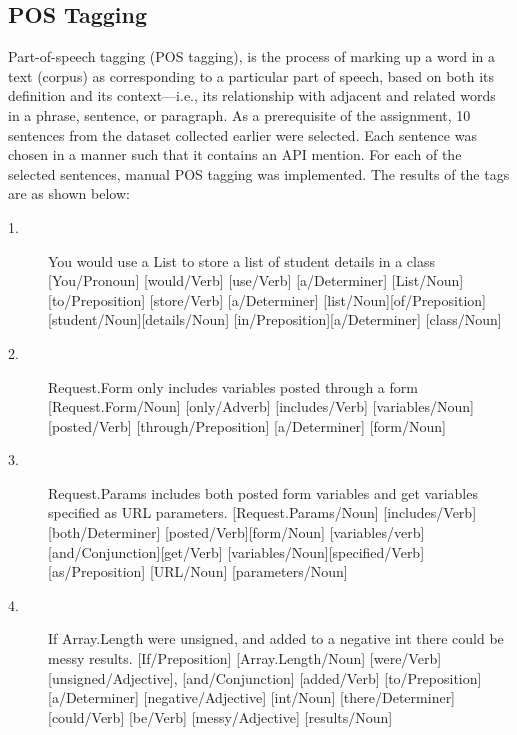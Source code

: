 \documentclass{sig-alternate-05-2015}
\begin{document}
\subsection{POS Tagging}

Part-of-speech tagging (POS tagging), is the process of marking up a word in a text (corpus) as corresponding to a particular part of speech, based on both its definition and its context—i.e., its relationship with adjacent and related words in a phrase, sentence, or paragraph. As a prerequisite of the assignment, 10 sentences from the dataset collected earlier were selected. Each sentence was chosen in a manner such that it contains an API mention. For each of the selected sentences, manual POS tagging was implemented. The results of the tags are as shown below: 

\begin{description}
\item[1.]
You would use a List to store a list of student details in a class \linebreak
{[You/Pronoun]} [would/Verb] [use/Verb] [a/Determiner] \linebreak
{[List/Noun]}{[to/Preposition]} [store/Verb] [a/Determiner] \linebreak
{[list/Noun]}{[of/Preposition]}[student/Noun][details/Noun] \linebreak
{[in/Preposition]}{[a/Determiner]} [class/Noun]

\item[2.]
Request.Form only includes variables posted through a form \linebreak
{[Request.Form/Noun]} [only/Adverb] [includes/Verb] \linebreak
{[variables/Noun]}[posted/Verb] [through/Preposition] \linebreak
{[a/Determiner]} [form/Noun]

\item[3.]
Request.Params includes both posted form variables and get variables specified as URL parameters. \linebreak
{[Request.Params/Noun]} [includes/Verb] \linebreak
{[both/Determiner]} {[posted/Verb]}[form/Noun] \linebreak
{[variables/verb]} [and/Conjunction]{[get/Verb]} \linebreak
{[variables/Noun]}[specified/Verb] [as/Preposition]\linebreak
{[URL/Noun]} [parameters/Noun]

\item[4.]
If Array.Length were unsigned, and added to a negative int there could be messy results. \linebreak
{[If/Preposition]} [Array.Length/Noun] [were/Verb] \linebreak
{[unsigned/Adjective]}, {[and/Conjunction]} [added/Verb] \linebreak
{[to/Preposition]} {[a/Determiner]} [negative/Adjective] \linebreak
{[int/Noun]} [there/Determiner] [could/Verb] [be/Verb] \linebreak
{[messy/Adjective]} [results/Noun]


\end{description}
\end{document}
